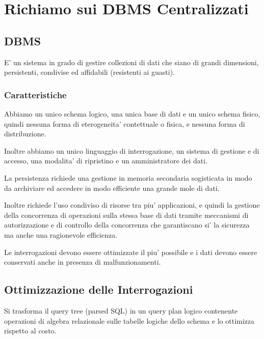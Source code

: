 \chapter{Richiamo sui DBMS Centralizzati}

\section{DBMS}

E' un sistema in grado di gestire collezioni di dati che siano di grandi dimensioni, persistenti, condivise ed affidabili (resistenti ai guasti).

\subsection{Caratteristiche}

Abbiamo un unico schema logico, una unica base di dati e un unico schema fisico, quindi nessuna forma di eterogeneita' contettuale o fisica, e nessuna forma di distribuzione.

Inoltre abbiamo un unico linguaggio di interrogazione, un sistema di gestione e di accesso, una modalita' di ripristino e un amministratore dei dati.

La persistenza richiede una gestione in memoria secondaria sogisticata in modo da archiviare ed accedere in modo efficiente una grande mole di dati.

Inoltre richiede l'uso condiviso di risorse tra piu' applicazioni, e quindi la gestione della concorrenza di operazioni sulla stessa base di dati tramite meccanismi di autorizzazione e di controllo della concorrenza che garantiscano si' la sicurezza ma anche una ragionevole efficienza.

Le interrogazioni devono essere ottimizzate il piu' possibile e i dati devono essere conservati anche in presenza di malfunzionamenti.


\section{Ottimizzazione delle Interrogazioni}

Si trasforma il query tree (parsed SQL) in un query plan logico contenente operazioni di algebra relazionale sulle tabelle logiche dello schema e lo ottimizza rispetto al costo.


